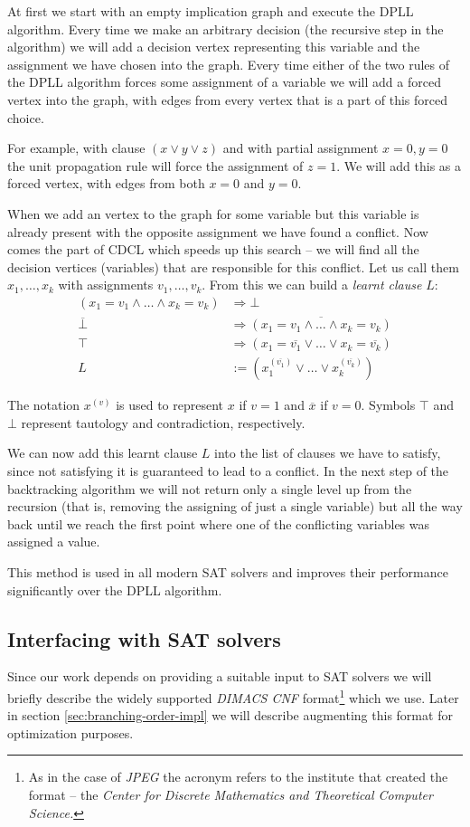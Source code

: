 At first we start with an empty implication graph and execute the DPLL algorithm.
Every time we make an arbitrary decision (the recursive step in the algorithm) we will add a decision vertex representing this variable and the assignment we have chosen into the graph.
Every time either of the two rules of the DPLL algorithm forces some assignment of a variable we will add a forced vertex into the graph, with edges from every vertex that is a part of this forced choice.

For example, with clause $(x \lor y \lor z)$ and with partial assignment $x=0, y=0$ the unit propagation rule will force the assignment of $z=1$.
We will add this as a forced vertex, with edges from both $x=0$ and $y=0$.

When we add an vertex to the graph for some variable but this variable is already present with the opposite assignment we have found a conflict.
Now comes the part of CDCL which speeds up this search -- we will find all the decision vertices (variables) that are responsible for this conflict.
Let us call them $x_1, \dots, x_k$ with assignments $v_1, \dots, v_k$.
From this we can build a \emph{learnt clause} $L$:
\begin{align*}
(x_1 = v_1 \land \dots \land x_k = v_k) &\Rightarrow \bot \\
\overline{\bot} &\Rightarrow \overline{(x_1 = v_1 \land \dots \land x_k = v_k)} \\
\top &\Rightarrow (x_1 = \overline{v_1} \lor \dots \lor x_k = \overline{v_k}) \\
L &:= (x_1^{(\overline{v_1})} \lor \dots \lor x_k^{(\overline{v_k})})
\end{align*}

The notation $x^{(v)}$ is used to represent $x$ if $v=1$ and $\overline{x}$ if $v=0$. Symbols $\top$ and $\bot$ represent tautology and contradiction, respectively.

We can now add this learnt clause $L$ into the list of clauses we have to satisfy, since not satisfying it is guaranteed to lead to a conflict.
In the next step of the backtracking algorithm we will not return only a single level up from the recursion (that is, removing the assigning of just a single variable) but all the way back until we reach the first point where one of the conflicting variables was assigned a value.

This method is used in all modern SAT solvers and improves their performance significantly over the DPLL algorithm.

\subsection{Interfacing with SAT solvers}
\label{sec:dimacs}
Since our work depends on providing a suitable input to SAT solvers we will briefly describe the widely supported \emph{DIMACS CNF} format\footnote{As in the case of \emph{JPEG} the acronym refers to the institute that created the format -- the \emph{Center for Discrete Mathematics and Theoretical Computer Science.}} which we use.
Later in section \ref{sec:branching-order-impl} we will describe augmenting this format for optimization purposes.


